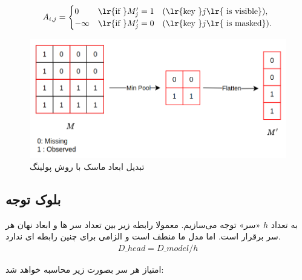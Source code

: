 $$
A_{i,j} = \begin{cases} 
	0 & \text{\lr{if }} M'_j = 1 \quad (\text{\lr{key }} j \text{\lr{ is visible}}), \\
	-\infty & \text{\lr{if }} M'_j = 0 \quad (\text{\lr{key }} j \text{\lr{ is masked}}).
\end{cases}
$$

%
%
%

\begin{figure}
	\centering
	\includegraphics[width=1\linewidth]{maskConv1}
	\caption{تبدیل ابعاد ماسک با روش پولینگ}
	\label{fig:maskconv1}
\end{figure}

\subsection{بلوک توجه}
به تعداد $h$ «سر» توجه می‌سازیم. معمولا رابطه زیر بین تعداد سر ها و ابعاد نهان هر سر برقرار است. اما مدل ما منطف است و الزامی برای چنین رابطه ای ندارد.
\begin{align*}
	D\_{head} = D\_{model} / h
\end{align*}

امتیاز هر سر بصورت زیر محاسبه خواهد شد:

